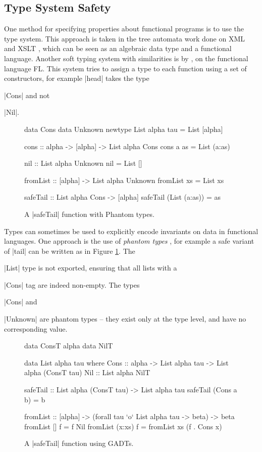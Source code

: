 \documentclass[preprint]{sigplanconf}
\begin{document}
\subsection{Type System Safety}

One method for specifying properties about functional programs is to use the type system. This approach is taken in the tree automata work done on XML and XSLT \cite{static_xslt}, which can be seen as an algebraic data type and a functional language. Another soft typing system with similarities is by \citet{aiken:type_infer}, on the functional language FL. This system tries to assign a type to each function using a set of constructors, for example |head| takes the type \ignore|Cons| and not \ignore|Nil|.

\begin{figure}
\begin{code}
data Cons
data Unknown
newtype List alpha tau = List [alpha]

cons :: alpha -> [alpha] -> List alpha Cons
cons a as = List (a:as)

nil :: List alpha Unknown
nil = List []

fromList :: [alpha] -> List alpha Unknown
fromList xs = List xs

safeTail :: List alpha Cons -> [alpha]
safeTail (List (a:as)) = as
\end{code}
\caption{A |safeTail| function with Phantom types.}
\label{fig:phantom}
\end{figure}

Types can sometimes be used to explicitly encode invariants on data in functional languages. One approach is the use of \textit{phantom types} \cite{fluet:phantom}, for example a safe variant of |tail| can be written as in Figure \ref{fig:phantom}. The \ignore|List| type is not exported, ensuring that all lists with a \ignore|Cons| tag are indeed non-empty. The types \ignore|Cons| and \ignore|Unknown| are phantom types -- they exist only at the type level, and have no corresponding value.

\begin{figure}
\ignore\begin{code}
data ConsT alpha
data NilT

data List alpha tau where
    Cons  :: alpha -> List alpha tau -> List alpha (ConsT tau)
    Nil   :: List alpha NilT

safeTail :: List alpha (ConsT tau) -> List alpha tau
safeTail (Cons a b) = b

fromList :: [alpha] -> (forall tau `o` List alpha tau -> beta) -> beta
fromList []      f = f Nil
fromList (x:xs)  f = fromList xs (f . Cons x)
\end{code}
\caption{A |safeTail| function using GADTs.}
\label{fig:gadt}
\end{figure}
\end{document}
